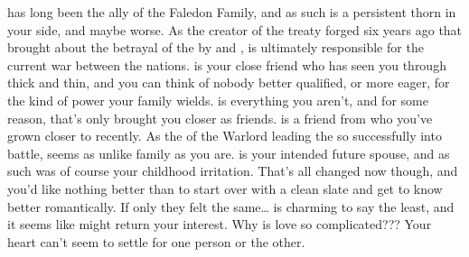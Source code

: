 \documentclass[char]{GL2020}
\begin{document}
\begin{contacts}
	\contact{\cDiplomat{}} has long been the ally of the Faledon Family, and as such is a persistent thorn in your side, and maybe worse. As the creator of the treaty forged six years ago that brought about the betrayal of the \pShip{} by \pTech{} and \pFarm{}, \cDiplomat{} is ultimately responsible for the current war between the nations.
	\contact{\cAmbition{}} is your close friend who has seen you through thick and thin, and you can think of nobody better qualified, or more eager, for the kind of power your family wields.  \cAmbition{} is everything you aren’t, and for some reason, that’s only brought you closer as friends.
	\contact{\cWarlordDaughter{}} is a friend from \pShip{} who you’ve grown closer to recently.  As the \cWarlordDaughter{\child} of the Warlord leading the \pShippies{} so successfully into battle, \cWarlordDaughter{} seems as unlike \cWarlordDaughter{\their} family as you are.
	\contact{\cChupStudent{}} is your intended future spouse, and as such was of course your childhood irritation.  That’s all changed now though, and you’d like nothing better than to start over with a clean slate and get to know \cChupStudent{\them} better romantically. If only they felt the same\ldots
	\contact{\cPresident{}} is charming to say the least, and it seems like \cPresident{\they} might return your interest. Why is love so complicated??? Your heart can’t seem to settle for one person or the other.
\end{contacts}
\end{document}
